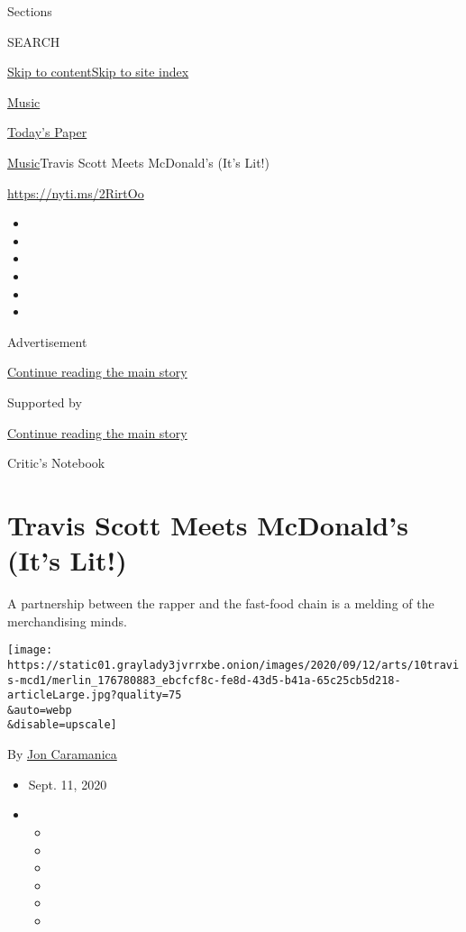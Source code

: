 Sections

SEARCH

\protect\hyperlink{site-content}{Skip to
content}\protect\hyperlink{site-index}{Skip to site index}

\href{https://www.nytimes3xbfgragh.onion/section/arts/music}{Music}

\href{https://myaccount.nytimes3xbfgragh.onion/auth/login?response_type=cookie\&client_id=vi}{}

\href{https://www.nytimes3xbfgragh.onion/section/todayspaper}{Today's
Paper}

\href{/section/arts/music}{Music}\textbar{}Travis Scott Meets McDonald's
(It's Lit!)

\url{https://nyti.ms/2RirtOo}

\begin{itemize}
\item
\item
\item
\item
\item
\item
\end{itemize}

Advertisement

\protect\hyperlink{after-top}{Continue reading the main story}

Supported by

\protect\hyperlink{after-sponsor}{Continue reading the main story}

Critic's Notebook

\hypertarget{travis-scott-meets-mcdonalds-its-lit}{%
\section{Travis Scott Meets McDonald's (It's
Lit!)}\label{travis-scott-meets-mcdonalds-its-lit}}

A partnership between the rapper and the fast-food chain is a melding of
the merchandising minds.

\texttt{[image: https://static01.graylady3jvrrxbe.onion/images/2020/09/12/arts/10travis-mcd1/merlin\_176780883\_ebcfcf8c-fe8d-43d5-b41a-65c25cb5d218-articleLarge.jpg?quality=75\\\&auto=webp\\\&disable=upscale]}

By \href{https://www.nytimes3xbfgragh.onion/by/jon-caramanica}{Jon
Caramanica}

\begin{itemize}
\item
  Sept. 11, 2020
\item
  \begin{itemize}
  \item
  \item
  \item
  \item
  \item
  \item
  \end{itemize}
\end{itemize}

